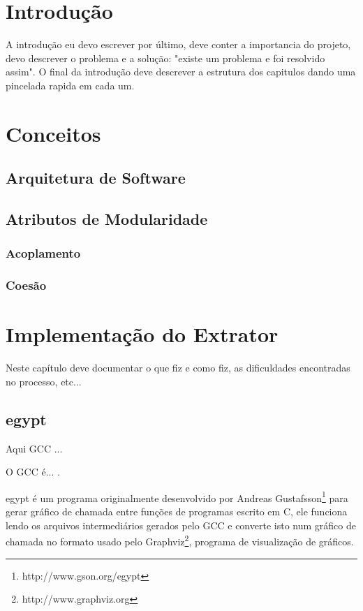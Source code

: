 \chapter{Introdução}

A introdução eu devo escrever por último, deve conter a importancia do projeto, devo descrever o problema e a solução: "existe um problema e foi resolvido assim". O final da introdução deve descrever a estrutura dos capitulos dando uma pincelada rapida em cada um.

\chapter{Conceitos}
\section{Arquitetura de Software}
\section{Atributos de Modularidade}
\subsection{Acoplamento}
\subsection{Coesão}

\chapter{Implementação do Extrator}

Neste capítulo deve documentar o que fiz e como fiz, as dificuldades encontradas no processo, etc...

\section{egypt}

Aqui GCC  ...

O GCC é... .

egypt é um programa originalmente desenvolvido por Andreas Gustafsson\footnote{http://www.gson.org/egypt} para gerar gráfico de chamada entre funções de programas escrito em C, ele funciona lendo os arquivos intermediários gerados pelo GCC e converte isto num gráfico de chamada no formato usado pelo Graphviz\footnote{http://www.graphviz.org}, programa de visualização de gráficos.

